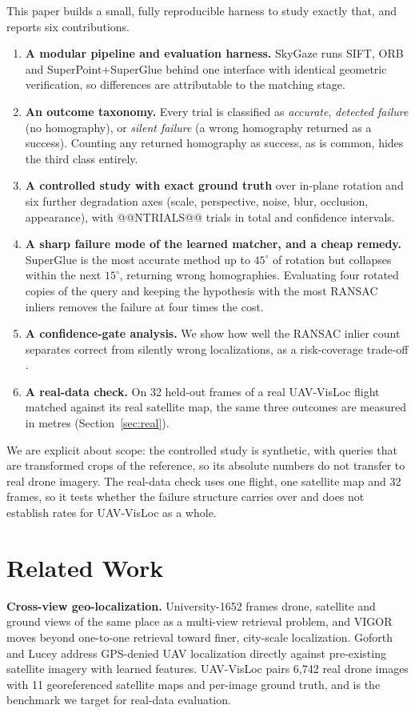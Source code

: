 \documentclass[conference]{IEEEtran}
\begin{document}
This paper builds a small, fully reproducible harness to study exactly that, and reports six contributions.
\begin{enumerate}
\item \textbf{A modular pipeline and evaluation harness.} SkyGaze runs SIFT, ORB and SuperPoint+SuperGlue behind one interface with identical geometric verification, so differences are attributable to the matching stage.
\item \textbf{An outcome taxonomy.} Every trial is classified as \emph{accurate}, \emph{detected failure} (no homography), or \emph{silent failure} (a wrong homography returned as a success). Counting any returned homography as success, as is common, hides the third class entirely.
\item \textbf{A controlled study with exact ground truth} over in-plane rotation and six further degradation axes (scale, perspective, noise, blur, occlusion, appearance), with @@NTRIALS@@ trials in total and confidence intervals.
\item \textbf{A sharp failure mode of the learned matcher, and a cheap remedy.} SuperGlue is the most accurate method up to $45^\circ$ of rotation but collapses within the next $15^\circ$, returning wrong homographies. Evaluating four rotated copies of the query and keeping the hypothesis with the most RANSAC inliers removes the failure at four times the cost.
\item \textbf{A confidence-gate analysis.} We show how well the RANSAC inlier count separates correct from silently wrong localizations, as a risk-coverage trade-off \cite{elyaniv2010foundations}.
\item \textbf{A real-data check.} On 32 held-out frames of a real UAV-VisLoc flight matched against its real satellite map, the same three outcomes are measured in metres (Section~\ref{sec:real}).
\end{enumerate}
We are explicit about scope: the controlled study is synthetic, with queries that are transformed crops of the reference, so its absolute numbers do not transfer to real drone imagery. The real-data check uses one flight, one satellite map and 32 frames, so it tests whether the failure structure carries over and does not establish rates for UAV-VisLoc as a whole.

\section{Related Work}

\textbf{Cross-view geo-localization.} University-1652 \cite{zheng2020university} frames drone, satellite and ground views of the same place as a multi-view retrieval problem, and VIGOR \cite{zhu2021vigor} moves beyond one-to-one retrieval toward finer, city-scale localization. Goforth and Lucey \cite{goforth2019gps} address GPS-denied UAV localization directly against pre-existing satellite imagery with learned features. UAV-VisLoc \cite{xu2024uavvisloc} pairs 6{,}742 real drone images with 11 georeferenced satellite maps and per-image ground truth, and is the benchmark we target for real-data evaluation.
\end{document}

